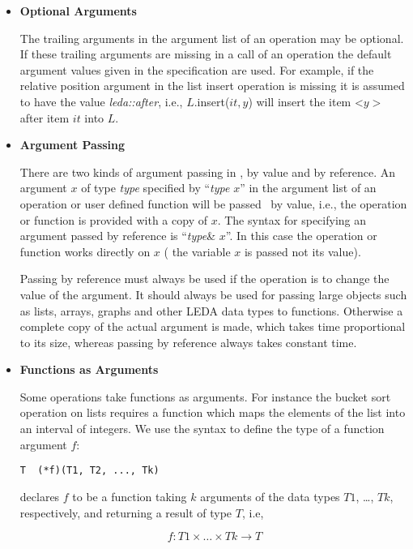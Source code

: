 \label{Arguments}
\begin{itemize}
\item{\bf Optional Arguments}

\smallskip
The trailing arguments in the argument list of an operation may be optional.
If these trailing arguments are missing in a call of an operation the default 
argument values given in the specification are used. For
example, if the relative position argument in the list insert operation
is missing it is assumed to have the value {\it leda::after}, i.e.,
$L$.insert($it,y$) will insert the item <$y>${} after item $it$ into $L$.

\item{\bf Argument Passing}

\smallskip
There are two kinds of argument passing in \CC, by value and by reference.  An
argument $x$ of type {\it type} specified by ``{\it type} $x$'' in the 
argument list of an operation or user defined function will be passed \
by value, i.e., the operation or function is provided with a copy of $x$.  
The syntax for specifying an argument passed by reference is 
``{\it type}\& $x$''.  In this case the operation or function works 
directly on $x$ ( the variable $x$ is passed not its value).

Passing by reference must always be used if the operation is to change the
value of the argument. It should always be used for passing large objects
such as lists, arrays, graphs and other LEDA data types to functions.
Otherwise a complete copy of the actual argument is made, which takes time
proportional to its size, whereas  passing by reference always takes constant
time. 


\item{\bf Functions as Arguments}

\smallskip
Some operations take functions as arguments. For instance the bucket sort 
operation on lists requires a function which maps the elements of the list into
an interval of integers. We use the \CC{} syntax to define the type of a 
function argument $f$:

\begin{verbatim}
T  (*f)(T1, T2, ..., Tk)
\end{verbatim}

declares $f$ to be a function taking $k$ arguments of the data types $T1$,
\dots, $Tk$, respectively, and returning a result of type $T$, i.e,

$$ f: T1 \times \dots \times Tk \longrightarrow T$$
\end{itemize}


